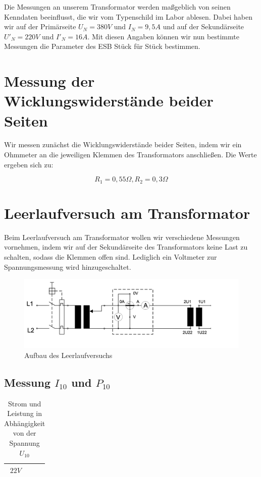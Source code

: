 \documentclass{article}
\begin{document}
Die Messungen an unserem Transformator werden maßgeblich von seinen Kenndaten beeinflusst, die wir vom Typenschild im Labor ablesen. Dabei haben wir auf der Primärseite $U_{N} = 380V$ und $I_{N} = 9,5A$ und auf der Sekundärseite $U'_{N} = 220V$ und $I'_{N} = 16A$. Mit diesen Angaben können wir nun bestimmte Messungen die Parameter des ESB Stück für Stück bestimmen.


\section{Messung der Wicklungswiderstände beider Seiten}

Wir messen zunächst die Wicklungswiderstände beider Seiten, indem wir ein Ohmmeter an die jeweiligen Klemmen des Transformators anschließen. Die Werte ergeben sich zu:

\begin{equation*}
  \label{eq:1}
  R_{1} = 0,55\Omega, R_{2} = 0,3\Omega
\end{equation*}

\section{Leerlaufversuch am Transformator}

Beim Leerlaufversuch am Transformator wollen wir verschiedene Messungen vornehmen, indem wir auf der Sekundärseite des Transformators keine Last zu schalten, sodass die Klemmen offen sind. Lediglich ein Voltmeter zur Spannungsmessung wird hinzugeschaltet.

\begin{figure}[h]
  \centering
  \includegraphics[width=\textwidth]{../assets/images/gep3/leerlauf_aufbau.png}
  \caption{Aufbau des Leerlaufversuchs}
  \label{fig:leerlaufaufbau}
\end{figure}

\subsection{Messung $I_{10}$ und $P_{10}$}
\label{sec:messung-i_10}
\begin{table}[h]
  \centering
  \begin{tabular}{|c|c|c|}
    \hline
    $22V$ & & \\
    \hline
  \end{tabular}
  \caption{Strom und Leistung in Abhängigkeit von der Spannung $U_{10}$}
  \label{tab:fifp}
\end{table}
\end{document}
